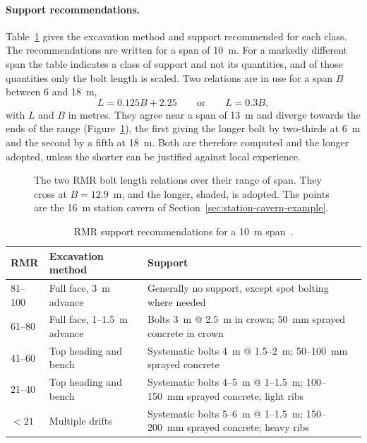 \paragraph{Support recommendations.}
Table~\ref{tab:rmr-support} gives the excavation method and support
recommended for each class. The recommendations are written for a span of
10~m. For a markedly different span the table indicates a class of support
and not its quantities, and of those quantities only the bolt length is
scaled. Two relations are in use for a span $B$ between 6 and 18~m,
\[
L = 0.125B + 2.25
\qquad \text{or} \qquad
L = 0.3B ,
\]
with \(L\) and \(B\) in metres. They agree near a span of 13~m and diverge
towards the ends of the range (Figure~\ref{fig:bolt-length-span}), the first giving the longer bolt by two-thirds
at 6~m and the second by a fifth at 18~m. Both are therefore computed and
the longer adopted, unless the shorter can be justified against local
experience.

\begin{figure}[htbp]
\centering
{}
\caption{The two RMR bolt length relations over their range of span. They cross at $B = 12.9$~m, and the longer, shaded, is adopted. The points are the 16~m station cavern of Section~\ref{sec:station-cavern-example}.}
\label{fig:bolt-length-span}
\end{figure}

\begin{table}[htbp]
\caption{RMR support recommendations for a 10~m span~\citep{bieniawski1989rmr}.}
\label{tab:rmr-support}
\centering
\small
\begin{tabularx}{\textwidth}{l l X}
\toprule
\textbf{RMR} & \textbf{Excavation method} & \textbf{Support} \\
\midrule
81--100 & Full face, 3~m advance & Generally no support, except spot bolting where needed \\
61--80 & Full face, 1--1.5~m advance & Bolts 3~m @ 2.5~m in crown; 50~mm sprayed concrete in crown \\
41--60 & Top heading and bench & Systematic bolts 4~m @ 1.5--2~m; 50--100~mm sprayed concrete \\
21--40 & Top heading and bench & Systematic bolts 4--5~m @ 1--1.5~m; 100--150~mm sprayed concrete; light ribs \\
$<21$ & Multiple drifts & Systematic bolts 5--6~m @ 1--1.5~m; 150--200~mm sprayed concrete; heavy ribs \\
\bottomrule
\end{tabularx}
\end{table}

